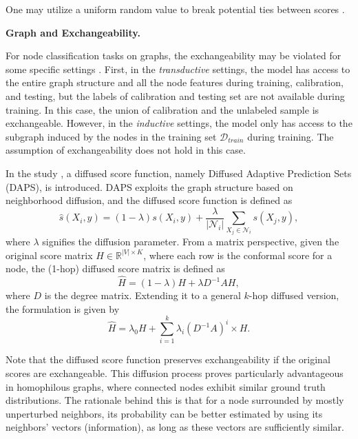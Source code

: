 % 
One may utilize a uniform random value to break potential ties between scores \cite{stutz2021learning}.


\noindent\textbf{Graph and Exchangeability.} 

For node classification tasks on graphs, 
the exchangeability may be violated for some specific settings \cite{zargarbashi2023conformal}.
First, 
in the \textit{transductive} settings, 
the model has access to the entire graph structure and all the node features during training, calibration, and testing, 
but the labels of calibration and testing set are not available during training. 
In this case, the union of calibration and the unlabeled sample is exchangeable.
However, 
in the \textit{inductive} settings, 
the model only has access to the subgraph induced by the nodes in the training set $\mathcal{D}_{train}$ during training.
The assumption of exchangeability does not hold in this case.


In the study \cite{zargarbashi2023conformal},
a diffused score function, 
namely Diffused Adaptive Prediction Sets (DAPS), 
is introduced. 
DAPS exploits the graph structure based on neighborhood diffusion,
and the diffused score function is defined as
\begin{equation}
    \hat{s}(X_i,y)=(1-\lambda)s(X_i,y) + \frac{\lambda}{|\mathcal{N}_i|} \sum_{X_j\in\mathcal{N}_i} s(X_j, y),
\end{equation}
where $\lambda$ signifies the diffusion parameter. 
From a matrix perspective, 
given the original score matrix $H\in\mathbb{R}^{|V|\times K}$, 
where each row is the conformal score for a node, 
the (1-hop) diffused score matrix is defined as 
\begin{equation}
    \hat{H} = (1-\lambda)H + \lambda D^{-1}AH,
\end{equation}
where $D$ is the degree matrix.
Extending it to a general $k$-hop diffused version,
the formulation is given by 
\begin{equation}
    \hat{H}=\lambda_0 H + \sum_{i=1}^k \lambda_i(D^{-1}A)^i \times H.
\end{equation}

Note that the diffused score function preserves exchangeability if the original scores are exchangeable. 
This diffusion process proves particularly advantageous in homophilous graphs, 
where connected nodes exhibit similar ground truth distributions. 
% 
The rationale behind this is that for a node surrounded by mostly unperturbed neighbors, 
its probability can be better estimated by using its neighbors' vectors (information), as long as these vectors are sufficiently similar.

